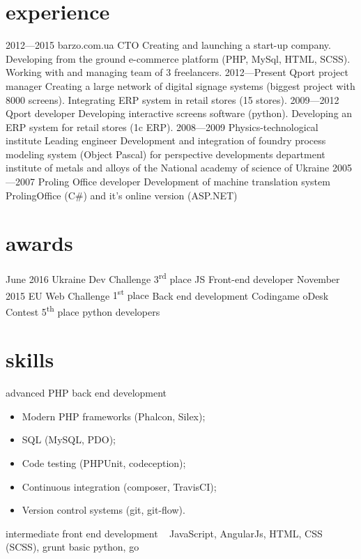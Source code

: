 \documentclass[hidelinks,a4paper]{cv}
\begin{document}
\section{experience}

\begin{entrylist}
  \entry
    {2012—2015}
    {barzo.com.ua}
    {CTO}
    {Creating and launching a start-up company. Developing from the ground e-commerce platform (PHP, MySql, HTML, SCSS). Working with and managing team of 3 freelancers.
    }
  \entry
    {2012—Present}
    {Qport}
    {project manager}
    {
    Creating a large network of digital signage systems (biggest project with 8000 screens).
    Integrating ERP system in retail stores (15 stores).
    }
  \entry
    {2009—2012}
    {Qport}
    {developer}
    {
    Developing interactive screens software (python). 
    Developing an ERP system for retail stores (1c ERP).
    }
  \entry
    {2008—2009} 
    {Physics-technological institute}
    {Leading engineer}
    {Development and integration of foundry process modeling system (Object Pascal) for perspective developments department institute of metals and alloys of the National academy of science of Ukraine}
  \entry
    {2005—2007}
    {Proling Office}
    {developer}
    {Development of machine translation system ProlingOffice (C\#) and it's online version (ASP.NET)}
\end{entrylist}

\section{awards}

\begin{entrylist}
  \entry
   {June 2016}
   {Ukraine Dev Challenge}
   {3\textsuperscript{rd} place}
   {JS Front-end developer}
  \entry  
   {November 2015}
   {EU Web Challenge}
   {1\textsuperscript{st} place}
   {Back end development}
  \entry  
   {}
   {Codingame oDesk Contest}
   {5\textsuperscript{th} place}
   {python developers}
\end{entrylist}

\newpage{}

\section{skills}
\begin{entrylist}
  \entry
   {advanced}
   {PHP back end development}
   {~}
   {
   \begin{itemize}
      \item Modern PHP frameworks (Phalcon, Silex);
      \item SQL (MySQL, PDO);
      \item Code testing (PHPUnit, codeception);
      \item Continuous integration (composer, TravisCI);
      \item Version control systems (git, git-flow).
    \end{itemize}
   }
  \entry
   {intermediate}
   {front end development}
   {~}
   {JavaScript, AngularJs, HTML, CSS (SCSS), grunt}
  \entry
   {basic}
   {python, go}
   {~}
   {~}
\end{entrylist}
\end{document}
